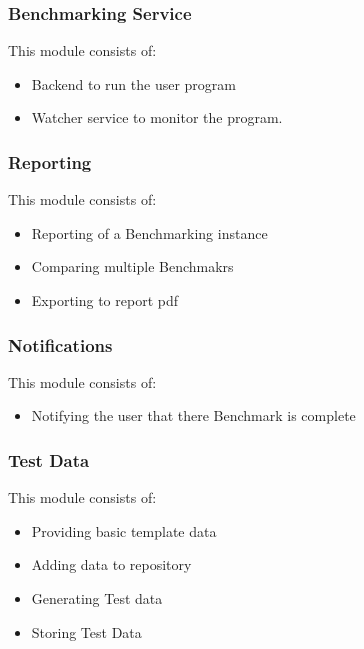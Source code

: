 \subsubsection{Benchmarking Service}
This module consists of:
\begin{itemize}
  \item Backend to run the user program
  \item Watcher service to monitor the program.
\end{itemize}

\subsubsection{Reporting}
This module consists of:
\begin{itemize}
  \item Reporting of a Benchmarking instance
  \item Comparing multiple Benchmakrs
  \item Exporting to report pdf
\end{itemize}

\subsubsection{Notifications}
This module consists of:
\begin{itemize}
  \item Notifying the user that there Benchmark is complete
\end{itemize}

\subsubsection{Test Data}
This module consists of:
\begin{itemize}
  \item Providing basic template data
  \item Adding data to repository
  \item Generating Test data
  \item Storing Test Data
\end{itemize}
